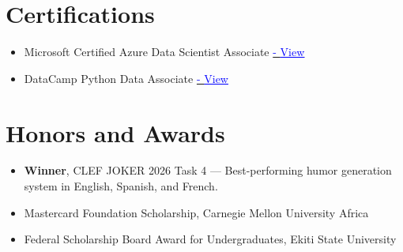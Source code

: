 \documentclass[letterpaper,10.99pt]{article}
\newcommand{\resumeItem}[1]{
  \item\small{
    {#1 \vspace{-2pt}}
  }
}
\newcommand{\resumeItemListStart}{\begin{itemize}}
\newcommand{\resumeItemListEnd}{\end{itemize}\vspace{-5pt}}
\begin{document}
\section{Certifications}
\resumeItemListStart
  \resumeItem{Microsoft Certified Azure Data Scientist Associate \href{https://learn.microsoft.com/api/credentials/share/en-us/Jayi2424-0319/50F82A0C3E79E45D?sharingId=2D24E344E44D5AF0}{\textcolor{blue}{- \underline{View}}}}
  \resumeItem{DataCamp Python Data Associate \href{https://drive.google.com/file/d/1bmHIgwfX75_h9yMZeIMzcNej7qhwbF99/view}{\textcolor{blue}{- \underline{View}}}}
\resumeItemListEnd

\section{Honors and Awards}
  \resumeItemListStart
    \resumeItem{\textbf{Winner}, CLEF JOKER 2026 Task 4 — Best-performing humor generation system in English, Spanish, and French.}
    \resumeItem{Mastercard Foundation Scholarship, Carnegie Mellon University Africa}
    \resumeItem{Federal Scholarship Board Award for Undergraduates, Ekiti State University}
  \resumeItemListEnd

\end{document}
